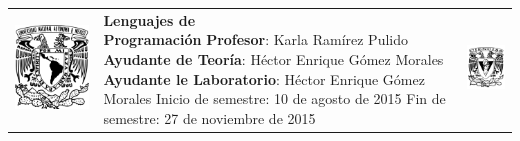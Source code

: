 \documentclass[10pt]{article}
\begin{document}
\begin{center}
\begin{tabular}[h]{c C{10cm} c}
\includegraphics[scale=.2]{cover.png} & 
\textbf{{\Large Lenguajes de \newline Programación}} 
\newline \textbf{Profesor}: Karla Ramírez Pulido 
\newline \textbf{Ayudante de Teoría}: Héctor Enrique Gómez Morales
\newline \textbf{Ayudante le Laboratorio}: Héctor Enrique Gómez Morales
\newline Inicio de semestre: 10 de agosto de 2015
\newline Fin de semestre: 27 de noviembre de 2015 &
\includegraphics[scale=.4]{cover2.png}
\end{tabular}
\end{center}
\end{document}
